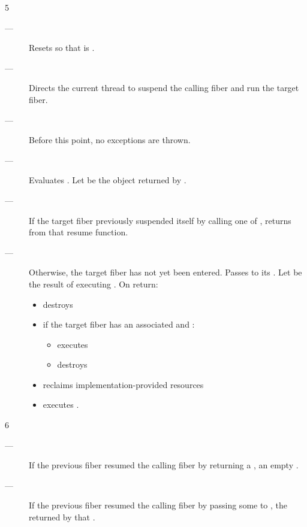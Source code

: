 5 \effects
\begin{description}
    \item[---] Resets \state so that \emptyfn is \true.
    \item[---] Directs the current thread to suspend the calling fiber and run
               the target fiber.
    \item[---] Before this point, no exceptions are thrown.
    \item[---] Evaluates .
               Let  be the \fiber object returned by .
    \item[---] If the target fiber previously suspended itself by calling one
               of \anyresume, returns  from that resume function.
    \item[---] Otherwise, the target fiber has not yet been entered.
               Passes  to its \entryfn.
               Let  be the result of executing
               . On return:
        \begin{itemize}
            \item destroys 
            \item if the target fiber has an associated  and :
                \begin{itemize}
                    \item executes 
                    \item destroys 
                \end{itemize}
            \item reclaims implementation-provided resources
            \item executes \resume[successor].
        \end{itemize}
\end{description}

6 \returns
\begin{description}
    \item[---] If the previous fiber resumed the calling fiber by returning a \fiber,
               an empty \fiber.
    \item[---] If the previous fiber resumed the calling fiber by passing some 
               to \anyresumewith, the \fiber returned by that .
\end{description}


